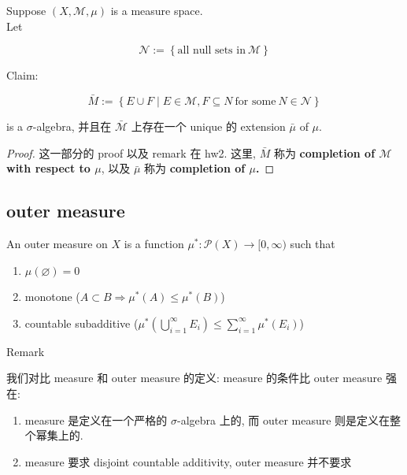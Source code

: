 \begin{theorem}{}

Suppose \((X,\mathcal{M},\mu)\) is a measure space.\\
Let

\[\mathcal{N} := \left\{ {\text{all null sets in}\ \mathcal{M}} \right\}\]

Claim:

\[\bar{M} := \left\{ {E \cup F \mid E \in \mathcal{M},F \subseteq N\ \text{for some}\ N \in \mathcal{N}} \right\}\]

is a \(\sigma\)-algebra, 并且在 \(\bar{\mathcal{M}}\) 上存在一个 unique 的 extension \(\bar{\mu}\) of \(\mu\).

\end{theorem}

\begin{proof}

这一部分的 proof 以及 remark 在 hw2. 这里, \(\bar{M}\) 称为 \textbf{completion of \(\mathcal{M}\) with respect to \(\mu\)}, 以及 \(\bar{\mu}\) 称为 \textbf{completion of \(\mu\).}

\end{proof}

\subsection{outer measure}\label{outer-measure}

\begin{definition}{}

An outer measure on \(X\) is a function \(\mu^{\ast}:\mathcal{P}(X)\rightarrow\lbrack 0,\infty)\) such that

\begin{enumerate}
\item
  \(\mu(\varnothing) = 0\)
\item
  monotone (\(A \subset B\Longrightarrow\mu^{\ast}(A) \leq \mu^{\ast}(B)\))
\item
  countable subadditive (\(\mu^{\ast}(\bigcup_{i = 1}^{\infty}E_{i}) \leq \sum_{i = 1}^{\infty}\mu^{\ast}(E_{i})\))
\end{enumerate}

\end{definition}

\begin{qlremark}{Remark}

我们对比 measure 和 outer measure 的定义: measure 的条件比 outer measure 强在:

\begin{enumerate}
\item
  measure 是定义在一个严格的 \(\sigma\)-algebra 上的, 而 outer measure 则是定义在整个幂集上的.
\item
  measure 要求 disjoint countable additivity, outer measure 并不要求
\end{enumerate}

\end{qlremark}

